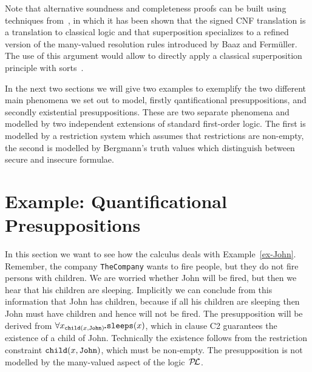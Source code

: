 \documentclass{\filespath jancl}
\newcommand\COMP{{\tt TheCompany}}
\def\sdot{\rule{.3ex}{.3ex}\hspace{-0.4ex}\;}
\def\presuppl{{\cal P\kern-.4ex L}}
\newcommand{\all}[3]{\forall {#1}_{#2}\sdot #3}
\begin{document}
Note that alternative soundness and completeness proofs can be built
using techniques from~\cite{GS00}, in which it has been shown that the
signed CNF translation is a translation to classical logic and that
superposition specializes to a refined version of the many-valued
resolution rules introduced by Baaz and Ferm\"uller. The use of this
argument would allow to directly apply a classical superposition
principle with sorts~\cite{Weidenbach96}.

In the next two sections we will give two examples to exemplify the two different main
phenomena we set out to model, firstly qantificational presuppositions, and secondly
existential presuppositions. These are two separate phenomena and modelled by two
independent extensions of standard first-order logic. The first is modelled by a restriction
system which assumes that restrictions are non-empty, the second is modelled by Bergmann's truth
values which distinguish between secure and insecure formulae.
 
\section{Example: Quantificational Presuppositions }
\label{sec:example}

In this section we want to see how the calculus deals with
Example~\ref{ex-John}. Remember, the company {\COMP} wants to fire
people, but they do not fire persons with children. We are worried
whether John will be fired, but then we hear that his children are
sleeping. Implicitly we can conclude from this information that John
has children, because if all his children are sleeping then John must
have children and hence will not be fired. The presupposition will be
derived from $\all{x}{{\tt child}(x,{\tt John})}{{\tt sleeps}(x)}$,
which in clause C2 guarantees the existence of a child of
John. Technically the existence follows from the restriction
constraint ${\tt child}(x,{\tt John})$, which must be non-empty. The
presupposition is not modelled by the many-valued aspect of the
logic~$\presuppl$.
\end{document}

